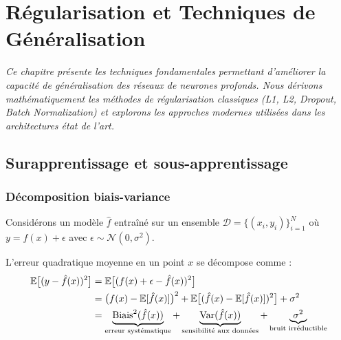 \chapter{R\'egularisation et Techniques de G\'en\'eralisation}
\label{ch:regularisation}

\noindent\textit{Ce chapitre pr\'esente les techniques fondamentales permettant d'am\'eliorer
la capacit\'e de g\'en\'eralisation des r\'eseaux de neurones profonds. Nous
d\'erivons math\'ematiquement les m\'ethodes de r\'egularisation classiques
(L1, L2, Dropout, Batch Normalization) et explorons les approches modernes
utilis\'ees dans les architectures \'etat de l'art.}\medskip

\section{Surapprentissage et sous-apprentissage}
\label{sec:overfitting-underfitting}

\subsection{D\'ecomposition biais-variance}

Consid\'erons un mod\`ele $\hat{f}$ entra\^in\'e sur un ensemble
$\mathcal{D} = \{(x_i, y_i)\}_{i=1}^N$ o\`u $y = f(x) + \epsilon$ avec
$\epsilon \sim \mathcal{N}(0, \sigma^2)$.

\begin{mathbox}[title=\textbf{D\'ecomposition biais-variance}]
L'erreur quadratique moyenne en un point $x$ se d\'ecompose comme :
\begin{align}
\mathbb{E}\bigl[(y - \hat{f}(x))^2\bigr]
&= \mathbb{E}\bigl[(f(x) + \epsilon - \hat{f}(x))^2\bigr] \nonumber \\
&= \bigl(f(x) - \mathbb{E}[\hat{f}(x)]\bigr)^2
   + \mathbb{E}\bigl[(\hat{f}(x) - \mathbb{E}[\hat{f}(x)])^2\bigr]
   + \sigma^2 \nonumber \\
&= \underbrace{\text{Biais}^2(\hat{f}(x))}_{\text{erreur syst\'ematique}}
   + \underbrace{\mathrm{Var}(\hat{f}(x))}_{\text{sensibilit\'e aux donn\'ees}}
   + \underbrace{\sigma^2}_{\text{bruit irr\'eductible}}
\label{eq:bias-variance}
\end{align}
\end{mathbox}

